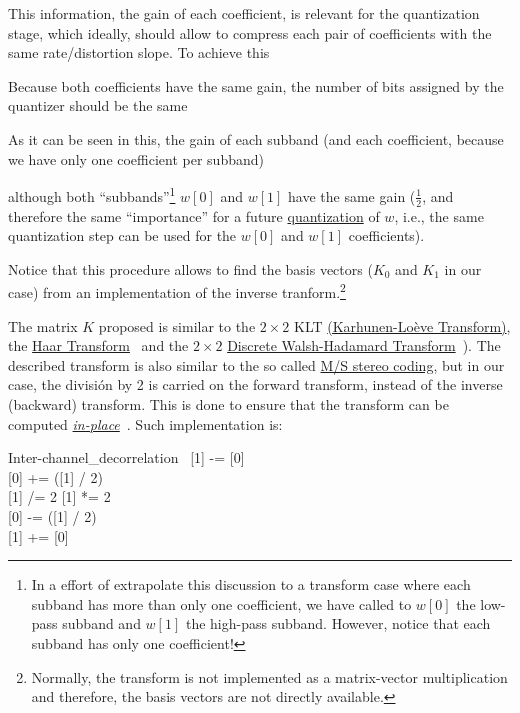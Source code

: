 This information, the gain of each coefficient, is relevant for the
quantization stage, which ideally, should allow to compress each pair
of coefficients with the same rate/distortion slope. To achieve this

Because both coefficients have the same gain, the number of bits assigned by the quantizer should be the same

As it can be seen in this, the gain of each subband (and each coefficient, because we have only one coefficient per subband)

although both ``subbands''\footnote{In a effort of extrapolate this
discussion to a transform case where each subband has more than only
one coefficient, we have called to $w[0]$ the low-pass subband and
$w[1]$ the high-pass subband. However, notice that each subband has
only one coefficient!} $w[0]$ and $w[1]$ have the same gain
($\frac{1}{2}$, and therefore the same ``importance'' for a
future
\href{https://en.wikipedia.org/wiki/Quantization_(signal_processing)}{quantization}
of $w$, i.e., the same quantization step can be used for the $w[0]$
and $w[1]$ coefficients).

Notice that this procedure allows to find the basis vectors ($K_0$ and
$K_1$ in our case) from an implementation of the inverse
tranform.\footnote{Normally, the transform is not implemented as a
matrix-vector multiplication and therefore, the basis vectors are not
directly available.}

The matrix $K$ proposed is similar to the $2\times 2$ KLT
\href{http://fourier.eng.hmc.edu/e161/lectures/klt/node3.html}{(Karhunen-Lo\`eve
  Transform)}, the
\href{http://wavelets.pybytes.com/wavelet/haar/}{Haar
  Transform}~\cite{vetterli1995wavelets} and the $2\times 2$
\href{https://en.wikipedia.org/wiki/Hadamard_transform}{Discrete
  Walsh-Hadamard Transform}~\cite{sayood2017introduction}).  The
described transform is also similar to the so called
\href{https://en.wikipedia.org/wiki/Joint_encoding#M/S_stereo_coding}{M/S
  stereo coding}, but in our case, the división by 2 is carried on the
forward transform, instead of the inverse (backward) transform. This
is done to ensure that the transform can be computed
\href{https://en.wikipedia.org/wiki/In-place_algorithm}{\emph{in-place}}~\cite{2006.sweldens}. Such
implementation is:

\begin{pseudocode}{Inter-channel\_decorrelation}{~}
  \BEGIN
    [1] -= [0] \\
    [0] += ([1] / 2) \\
    [1] /= 2
  \END
  \ENDPROCEDURE
  \BEGIN
    [1] *= 2 \\
    [0] -= ([1] / 2) \\
    [1] += [0]
  \END
  \ENDPROCEDURE
\end{pseudocode}

